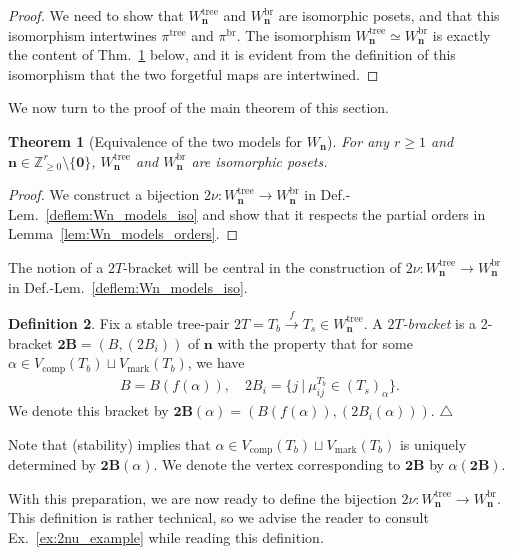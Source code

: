 \documentclass[11pt]{amsart}
\newtheorem{theorem}{Theorem}[section]
\theoremstyle{definition}
\newtheorem{definition}[theorem]{Definition}
\theoremstyle{remark}
\theoremstyle{plain}
\newcommand{\bZ}{\mathbb{Z}}
\newcommand\bn{\mathbf{n}}
\newcommand\bzero{\mathbf{0}}
\newcommand{\btB}{{\mathbf{2B}}}
\newcommand{\on}{\operatorname}
\newcommand{\comp}{C^2}
\renewcommand{\comp}{{\on{comp}}}
\newcommand{\mk}{{\on{mark}}}
\newcommand{\tree}{{\on{tree}}}
\newcommand{\br}{{\on{br}}}
\newcommand{\sr}{\stackrel}
\begin{document}
\begin{proof}
We need to show that $W_\bn^\tree$ and $W_\bn^\br$ are isomorphic posets, and that this isomorphism intertwines $\pi^\tree$ and $\pi^\br$.
The isomorphism $W_\bn^\tree \simeq W_\bn^\br$ is exactly the content of Thm.~\ref{thm:iso} below, and it is evident from the definition of this isomorphism that the two forgetful maps are intertwined.
\end{proof}


We now turn to the proof of the main theorem of this section.

\begin{theorem}[Equivalence of the two models for $W_\bn$]
\label{thm:iso}
For any $r\geq 1$ and $\bn \in \bZ_{\geq0}^r\setminus\{\bzero\}$, $W_\bn^\tree$ and $W_\bn^\br$ are isomorphic posets.
\end{theorem}

\begin{proof}
We construct a bijection $2\nu\colon W_\bn^\tree \to W_\bn^\br$ in Def.-Lem.~\ref{deflem:Wn_models_iso} and show that it respects the partial orders in Lemma~\ref{lem:Wn_models_orders}.
\end{proof}

The notion of a $2T$-bracket will be central in the construction of $2\nu\colon W_\bn^\tree \to W_\bn^\br$ in Def.-Lem.~\ref{deflem:Wn_models_iso}.


\begin{definition}
\label{def:2T_bracket}
Fix a stable tree-pair $2T = T_b \sr{f}{\to} T_s \in W_\bn^\tree$.
A \emph{$2T$-bracket} is a 2-bracket $\btB = (B,(2B_i))$ of $\bn$ with the property that for some $\alpha \in V_\comp(T_b) \sqcup V_\mk(T_b)$, we have
\begin{align}
B = B(f(\alpha)), \quad 2B_i = \bigl\{j \:|\: \mu_{ij}^{T_b} \in (T_s)_\alpha\bigr\}.
\end{align}
We denote this bracket by $\btB(\alpha) = (B(f(\alpha)),(2B_i(\alpha)))$.\label{p:btBalpha}
\null\hfill$\triangle$
\end{definition}

\noindent Note that {\sc(stability)} implies that $\alpha \in V_\comp(T_b) \sqcup V_\mk(T_b)$ is uniquely determined by $\btB(\alpha)$.
We denote the vertex corresponding to $\btB$ by $\alpha(\btB)$. \label{p:alpha_2B}

With this preparation, we are now ready to define the bijection $2\nu\colon W_\bn^\tree \to W_\bn^\br$.
This definition is rather technical, so we advise the reader to consult Ex.~\ref{ex:2nu_example} while reading this definition.
\end{document}
